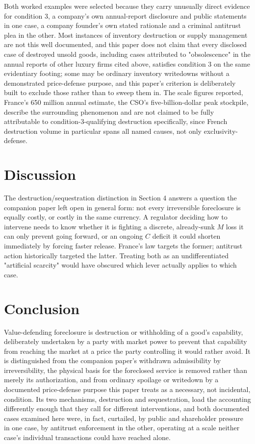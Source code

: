\documentclass[11pt]{article}
\begin{document}
Both worked examples were selected because they carry unusually direct evidence for condition 3, a company's own annual-report disclosure and public statements in one case, a company founder's own stated rationale and a criminal antitrust plea in the other. Most instances of inventory destruction or supply management are not this well documented, and this paper does not claim that every disclosed case of destroyed unsold goods, including cases attributed to "obsolescence" in the annual reports of other luxury firms cited above, satisfies condition 3 on the same evidentiary footing; some may be ordinary inventory writedowns without a demonstrated price-defense purpose, and this paper's criterion is deliberately built to exclude those rather than to sweep them in. The scale figures reported, France's \texteuro{}650 million annual estimate, the CSO's five-billion-dollar peak stockpile, describe the surrounding phenomenon and are not claimed to be fully attributable to condition-3-qualifying destruction specifically, since French destruction volume in particular spans all named causes, not only exclusivity-defense.

\section{Discussion}

The destruction/sequestration distinction in Section 4 answers a question the companion paper left open in general form: not every irreversible foreclosure is equally costly, or costly in the same currency. A regulator deciding how to intervene needs to know whether it is fighting a discrete, already-sunk $M$ loss it can only prevent going forward, or an ongoing $C$ deficit it could shorten immediately by forcing faster release. France's law targets the former; antitrust action historically targeted the latter. Treating both as an undifferentiated "artificial scarcity" would have obscured which lever actually applies to which case.

\section{Conclusion}

Value-defending foreclosure is destruction or withholding of a good's capability, deliberately undertaken by a party with market power to prevent that capability from reaching the market at a price the party controlling it would rather avoid. It is distinguished from the companion paper's withdrawn admissibility by irreversibility, the physical basis for the foreclosed service is removed rather than merely its authorization, and from ordinary spoilage or writedown by a documented price-defense purpose this paper treats as a necessary, not incidental, condition. Its two mechanisms, destruction and sequestration, load the accounting differently enough that they call for different interventions, and both documented cases examined here were, in fact, curtailed, by public and shareholder pressure in one case, by antitrust enforcement in the other, operating at a scale neither case's individual transactions could have reached alone.
\end{document}
